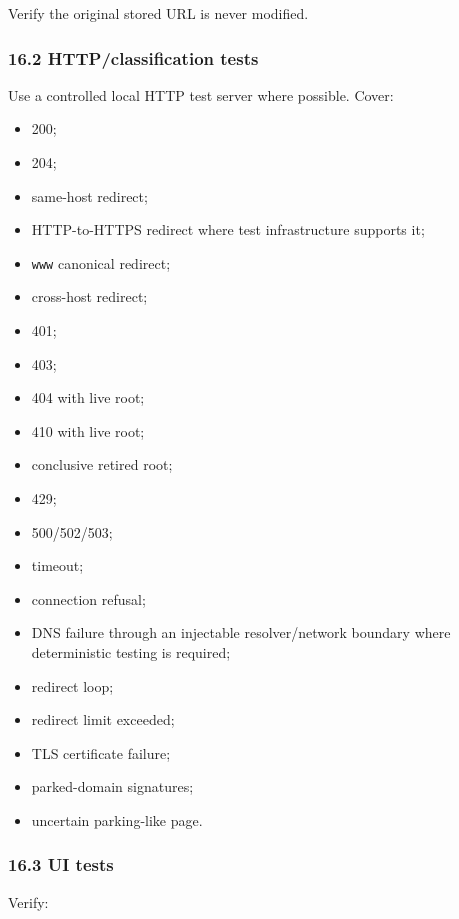\documentclass[
  letterpaper,
]{article}
\newcommand{\passthrough}[1]{#1}
\providecommand{\tightlist}{%
  \setlength{\itemsep}{0pt}\setlength{\parskip}{0pt}}
\begin{document}
Verify the original stored URL is never modified.

\subsubsection{16.2 HTTP/classification tests}\label{162-httpclassification-tests}

Use a controlled local HTTP test server where possible. Cover:

\begin{itemize}
\tightlist
\item
  200;
\item
  204;
\item
  same-host redirect;
\item
  HTTP-to-HTTPS redirect where test infrastructure supports it;
\item
  \passthrough{\lstinline!www!} canonical redirect;
\item
  cross-host redirect;
\item
  401;
\item
  403;
\item
  404 with live root;
\item
  410 with live root;
\item
  conclusive retired root;
\item
  429;
\item
  500/502/503;
\item
  timeout;
\item
  connection refusal;
\item
  DNS failure through an injectable resolver/network boundary where deterministic testing is required;
\item
  redirect loop;
\item
  redirect limit exceeded;
\item
  TLS certificate failure;
\item
  parked-domain signatures;
\item
  uncertain parking-like page.
\end{itemize}

\subsubsection{16.3 UI tests}\label{163-ui-tests}

Verify:
\end{document}
